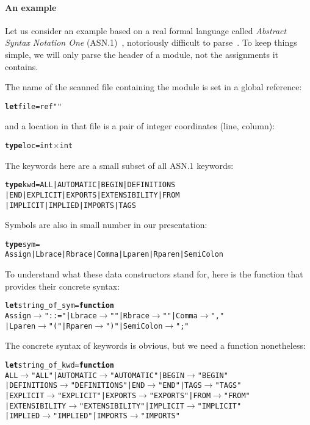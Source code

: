 \paragraph{An example}

Let us consider an example based on a real formal language called
\emph{Abstract Syntax Notation One} (ASN.1)~\citep{Larmouth_1999,
  Dubuisson_2001}, notoriously difficult to
parse~\citep{Rinderknecht_1995}. To keep things simple, we will only
parse the header of a module, not the assignments it contains.

The name of the scanned file containing the module is set in a global
reference:
\begin{alltt}
\textbf{let} file = ref ""
\end{alltt}
and a location in that file is a pair of integer coordinates (line,
column):
\begin{alltt}
\textbf{type} loc = int \(\times\) int
\end{alltt}
The keywords here are a small subset of all ASN.1 keywords:
\begin{alltt}
\textbf{type} kwd = ALL | AUTOMATIC | BEGIN | DEFINITIONS
| END | EXPLICIT | EXPORTS | EXTENSIBILITY | FROM
| IMPLICIT | IMPLIED | IMPORTS | TAGS
\end{alltt}
Symbols are also in small number in our presentation:
\begin{alltt}
\textbf{type} sym =
  Assign | Lbrace | Rbrace | Comma | Lparen | Rparen | SemiColon
\end{alltt}
To understand what these data constructors stand for, here is the
function that provides their concrete syntax:
\begin{alltt}
\textbf{let} string\_of\_sym = \textbf{function}
  Assign \(\rightarrow\) "::=" | Lbrace \(\rightarrow\) "{" | Rbrace \(\rightarrow\) "}" | Comma \(\rightarrow\) ","
| Lparen \(\rightarrow\) "(" | Rparen \(\rightarrow\) ")" | SemiColon \(\rightarrow\) ";"
\end{alltt}
The concrete syntax of keywords is obvious, but we need a function
nonetheless:
\begin{alltt}
\textbf{let} string\_of\_kwd = \textbf{function}
  ALL \(\rightarrow\) "ALL" | AUTOMATIC \(\rightarrow\) "AUTOMATIC" | BEGIN \(\rightarrow\) "BEGIN"
| DEFINITIONS \(\rightarrow\) "DEFINITIONS" | END \(\rightarrow\) "END" | TAGS \(\rightarrow\) "TAGS"
| EXPLICIT \(\rightarrow\) "EXPLICIT" | EXPORTS \(\rightarrow\) "EXPORTS" | FROM \(\rightarrow\) "FROM" 
| EXTENSIBILITY \(\rightarrow\) "EXTENSIBILITY" | IMPLICIT \(\rightarrow\) "IMPLICIT"
| IMPLIED \(\rightarrow\) "IMPLIED" | IMPORTS \(\rightarrow\) "IMPORTS"
\end{alltt}
